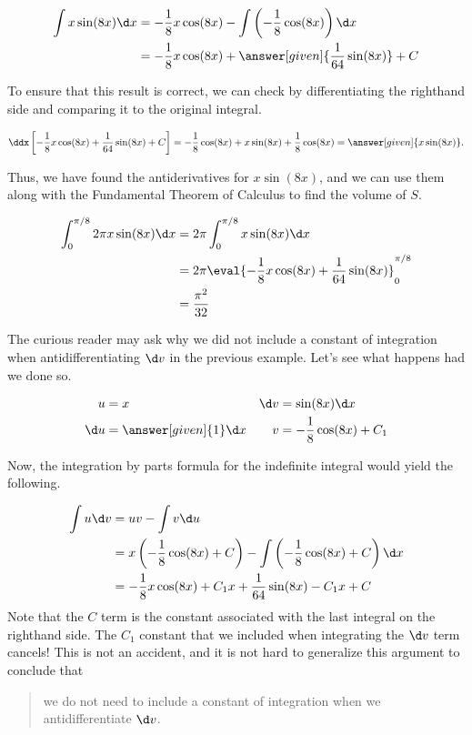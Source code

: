 \documentclass{ximera}
\begin{document}
\begin{model}
\begin{align*}
\int x\sin(8x) \d x &=-\frac{1}{8}x\cos(8x) -\int \left(-\frac{1}{8}\cos(8x)\right) \d x \\
&=-\frac{1}{8}x\cos(8x) + \answer[given]{\frac{1}{64}\sin(8x)} +C 
\end{align*}

To ensure that this result is correct, we can check by differentiating the righthand side and comparing it to the original integral.

\[
\ddx\left[-\frac{1}{8}x\cos(8x) +\frac{1}{64}\sin(8x) +C \right] = -\frac{1}{8} \cos(8x) +x \sin(8x) +\frac{1}{8} \cos(8x) = \answer[given]{x \sin(8x)}.
\]

Thus, we have found the antiderivatives for $x\sin(8x)$, and we can use them along with the Fundamental Theorem of Calculus to find the volume of $S$.

\begin{align*}
\int_{0}^{\pi/8} 2 \pi x\sin(8x) \d x &= 2 \pi \int_{0}^{\pi/8} x\sin(8x) \d x \\
&= 2 \pi \eval{ -\frac{1}{8}x\cos(8x) + \frac{1}{64}\sin(8x)}_0^{\pi/8}\\
&=\frac{\pi^{2}}{32}
\end{align*}

\begin{remark}
The curious reader may ask why we did not include a constant of integration when antidifferentiating $\d v$ in the previous example.  Let's see what happens had we done so.

\begin{align*}
u &= x & \d v & = \sin(8x) \d x \\
 \d u &= \answer[given]{1} \d x & v&=-\frac{1}{8}\cos(8x) +C_1
\end{align*}

Now, the integration by parts formula for the indefinite integral would yield the following.

\begin{align*}
\int u \d v &= uv -\int v \d u \\
 &=x \left(-\frac{1}{8}\cos(8x)+C\right) -\int \left(-\frac{1}{8}\cos(8x)+C\right) \d x \\
  &=-\frac{1}{8}x\cos(8x)+C_1x + \frac{1}{64}\sin(8x) -C_1x +C \\
\end{align*}
Note that the $C$ term is the constant associated with the last integral on the righthand side.  The $C_1$ constant that we included when integrating the $\d v$ term cancels!  This is not an accident, and it is not hard to generalize this argument to conclude that

\begin{quote}
we do not need to include a constant of integration when we antidifferentiate $\d v$.
\end{quote}
\end{remark}

\end{model}
\end{document}
